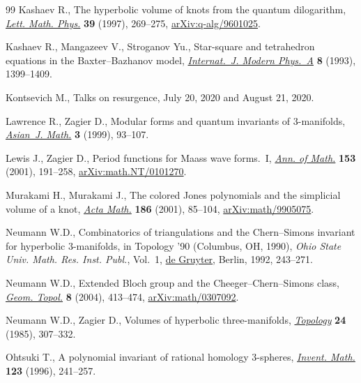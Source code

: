 \documentclass[pdftex]{sigma}
\numberwithin{equation}{section}
\begin{document}
\begin{thebibliography}{99}
Kashaev R., The hyperbolic volume of knots from the quantum dilogarithm,
 \href{https://doi.org/10.1023/A:1007364912784}{\textit{Lett. Math. Phys.}} \textbf{39} (1997), 269--275,
 \href{https://arxiv.org/abs/q-alg/9601025}{arXiv:q-alg/9601025}.

Kashaev R., Mangazeev V., Stroganov Yu., Star-square and tetrahedron equations
 in the {B}axter--{B}azhanov model, \href{https://doi.org/10.1142/S0217751X93000588}{\textit{Internat.~J. Modern Phys.~A}}
 \textbf{8} (1993), 1399--1409.

Kontsevich M., Talks on resurgence, {J}uly 20, 2020 and {A}ugust 21, 2020.

Lawrence R., Zagier D., Modular forms and quantum invariants of
 {$3$}-manifolds, \href{https://doi.org/10.4310/AJM.1999.v3.n1.a5}{\textit{Asian~J. Math.}} \textbf{3} (1999), 93--107.

Lewis J., Zagier D., Period functions for {M}aass wave forms.~{I}, \href{https://doi.org/10.2307/2661374}{\textit{Ann.
 of Math.}} \textbf{153} (2001), 191--258, \href{https://arxiv.org/abs/math.NT/0101270}{arXiv:math.NT/0101270}.

Murakami H., Murakami J., The colored {J}ones polynomials and the simplicial
 volume of a knot, \href{https://doi.org/10.1007/BF02392716}{\textit{Acta Math.}} \textbf{186} (2001), 85--104,
 \href{https://arxiv.org/abs/math/9905075}{arXiv:math/9905075}.

Neumann W.D., Combinatorics of triangulations and the {C}hern--{S}imons
 invariant for hyperbolic {$3$}-manifolds, in Topology '90 ({C}olumbus, {OH},
 1990), \textit{Ohio State Univ. Math. Res. Inst. Publ.}, Vol.~1, \href{https://doi.org/10.1515/9783110857726.243}{de Gruyter},
 Berlin, 1992, 243--271.

Neumann W.D., Extended {B}loch group and the {C}heeger--{C}hern--{S}imons
 class, \href{https://doi.org/10.2140/gt.2004.8.413}{\textit{Geom. Topol.}} \textbf{8} (2004), 413--474,
 \href{https://arxiv.org/abs/math/0307092}{arXiv:math/0307092}.

Neumann W.D., Zagier D., Volumes of hyperbolic three-manifolds,
  \href{https://doi.org/10.1016/0040-9383(85)90004-7}{\textit{Topology}} \textbf{24} (1985), 307--332.

Ohtsuki T., A polynomial invariant of rational homology {$3$}-spheres,
 \href{https://doi.org/10.1007/s002220050025}{\textit{Invent. Math.}} \textbf{123} (1996), 241--257.


\end{thebibliography}
\end{document}
